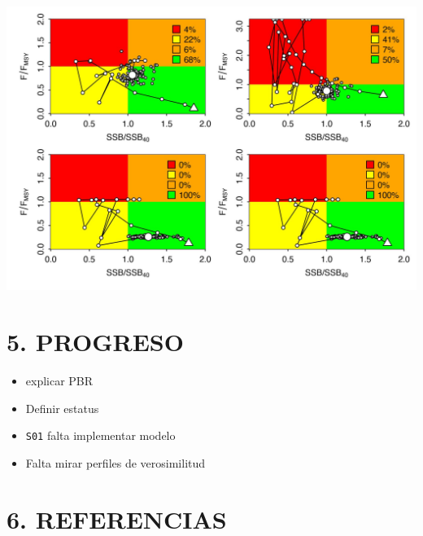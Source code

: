 \documentclass[
]{article}
\begin{document}
\begin{center}\includegraphics{Dtrunculus_SS3_2024_files/figure-latex/unnamed-chunk-19-1} \end{center}

\pagebreak

\hypertarget{progreso}{%
\section{5. PROGRESO}\label{progreso}}

\begin{itemize}
\item
  explicar PBR
\item
  Definir estatus
\item
  \texttt{S01} falta implementar modelo
\item
  Falta mirar perfiles de verosimilitud
\end{itemize}

\pagebreak

\hypertarget{referencias}{%
\section*{6. REFERENCIAS}\label{referencias}}
\end{document}
